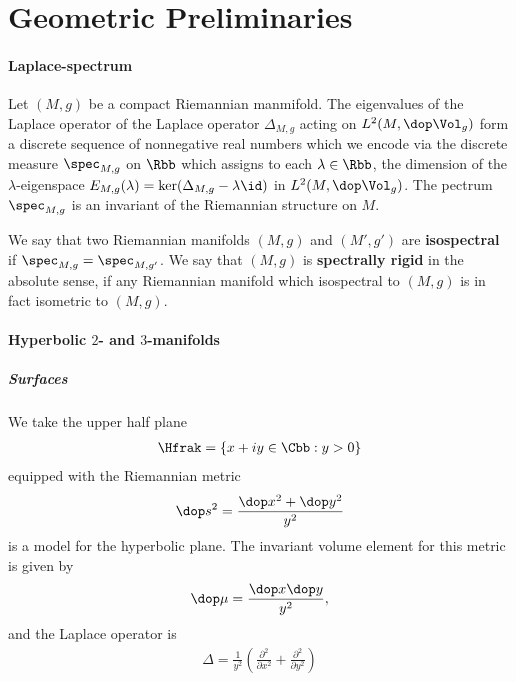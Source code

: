 \section{Geometric Preliminaries}
\paragraph{Laplace-spectrum}
Let $(M,g)$ be a compact Riemannian manmifold. The eigenvalues of the Laplace operator of the Laplace operator $\Delta_{M,g}$ acting on $L^2(M,\dop \Vol_g)$ form a discrete sequence of nonnegative real numbers which we encode via the discrete measure $\spec_{M,g}$ on $\Rbb$ which assigns to each $\lambda \in \Rbb$, the dimension of the $\lambda$-eigenspace $E_{M,g}(\lambda)=\ker (\Delta_{M,g}- \lambda \id)$ in $L^2(M, \dop \Vol_g)$. The pectrum $\spec_{M,g}$ is an invariant of the Riemannian structure on $M$.

We say that two Riemannian manifolds $(M,g)$ and $(M',g')$ are \textbf{isospectral} if $\spec_{M,g} = \spec_{M,g'}$. We say that $(M,g)$ is \textbf{spectrally rigid} in the absolute sense, if any Riemannian manifold which isospectral to $(M,g)$ is in fact isometric to $(M,g)$.

\paragraph{Hyperbolic $2$- and $3$-manifolds}

\subparagraph{Surfaces}
We take the upper half plane
\begin{align*}
    \Hfrak = \{ x+iy \in \Cbb : y >0\}
\end{align*}
equipped with the Riemannian metric
\begin{align*}
    \dop s^2 = \frac{\dop x^2 +\dop y^2}{y^2}
\end{align*}
is a model for the hyperbolic plane. The invariant volume element for this metric is given by
\begin{align*}
    \dop \mu = \frac{\dop x \dop y}{y^2},
\end{align*}
and the Laplace operator is
\begin{align*}
    \Delta = \frac{1}{y^2}\left( \frac{\partial^2 }{\partial x^2}+ \frac{\partial^2 }{\partial y^2} \right)
\end{align*}

